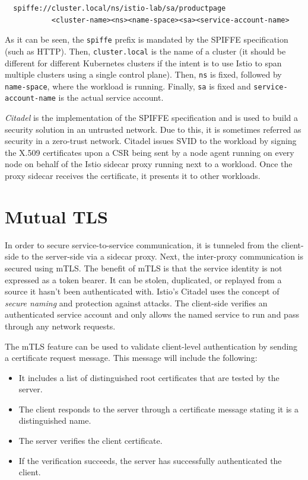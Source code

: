 \begin{lstlisting}
  spiffe://cluster.local/ns/istio-lab/sa/productpage
           <cluster-name><ns><name-space><sa><service-account-name>
\end{lstlisting}

\noindent As it can be seen, the \texttt{spiffe} prefix is mandated by the SPIFFE specification (such as HTTP). Then, \texttt{cluster.local} is the name of a cluster (it should be different for different Kubernetes clusters if the intent is to use Istio to span multiple clusters using a single control plane). Then, \texttt{ns} is fixed, followed by \texttt{name-space}, where the workload is running. Finally, \texttt{sa} is fixed and \texttt{service-account-name} is the actual service account.

\textit{Citadel} is the implementation of the SPIFFE specification and is used to build a security solution in an untrusted network. Due to this, it is sometimes referred as security in a zero-trust network. Citadel issues SVID to the workload by signing the X.509 certificates upon a CSR being sent by a node agent running on every node on behalf of the Istio sidecar proxy running next to a workload. Once the proxy sidecar receives the certificate, it presents it to other workloads.

\section{Mutual TLS}
In order to secure service-to-service communication, it is tunneled from the client-side to the server-side via a sidecar proxy. Next, the inter-proxy communication is secured using mTLS. The benefit of mTLS is that the service identity is not expressed as a token bearer. It can be stolen, duplicated, or replayed from a source it hasn't been authenticated with. Istio's Citadel uses the concept of \textit{secure naming} and protection against attacks. The client-side verifies an authenticated service account and only allows the named service to run and pass through any network requests.

The mTLS feature can be used to validate client-level authentication by sending a certificate request message. This message will include the following:

\begin{itemize}
    \item It includes a list of distinguished root certificates that are tested by the server.
    \item The client responds to the server through a certificate message stating it is a distinguished name.
    \item The server verifies the client certificate.
    \item If the verification succeeds, the server has successfully authenticated the client.
\end{itemize}

